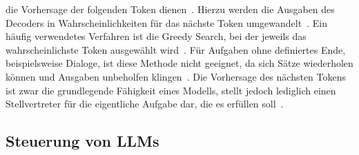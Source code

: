 die Vorhersage der folgenden Token dienen~\cite[26]{llm09}. Hierzu werden die Ausgaben des Decoders in Wahrscheinlichkeiten für das nächste Token 
umgewandelt~\cite[2995]{cb01}. Ein häufig verwendetes Verfahren ist die Greedy Search, bei der jeweils das wahrscheinlichste Token ausgewählt wird~\cite[26]{llm09}.
Für Aufgaben ohne definiertes Ende, beispielsweise Dialoge, ist diese Methode nicht geeignet, da sich Sätze wiederholen können und Ausgaben unbeholfen 
klingen~\cite[26]{llm09}. Die Vorhersage des nächsten Tokens ist zwar die grundlegende Fähigkeit eines Modells, stellt jedoch lediglich einen Stellvertreter für
die eigentliche Aufgabe dar, die es erfüllen soll~\cite[10]{llm08}.

\subsection{Steuerung von LLMs}\label{subsec:steuerungllm}


